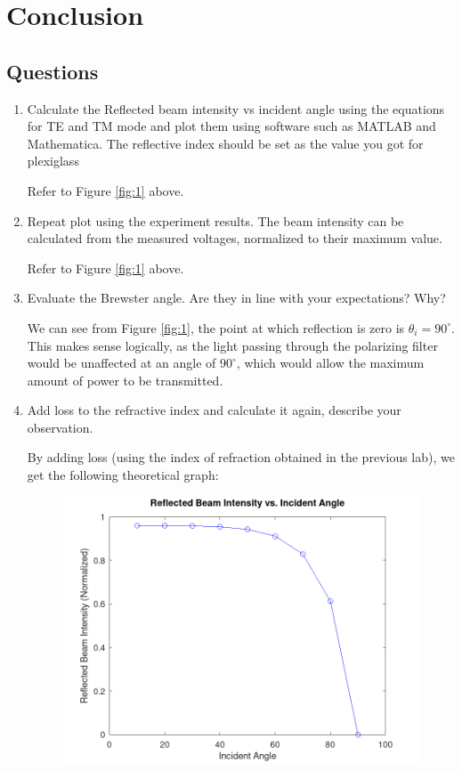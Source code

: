 \documentclass[
	letterpaper, %
	10pt, %
]{CSUniSchoolLabReport}
\begin{document}
\section{Conclusion}

\subsection{Questions}

\begin{enumerate}

  \item  Calculate the Reflected beam intensity vs incident angle using the equations for TE and TM mode and plot them using software such as MATLAB and Mathematica. The reflective index should be set as the value you got for plexiglass

    Refer to Figure \ref{fig:1} above.

  \item Repeat plot using the experiment results. The beam intensity can be calculated from the measured voltages, normalized to their maximum value.

    Refer to Figure \ref{fig:1} above.


  \item Evaluate the Brewster angle. Are they in line with your expectations? Why?

    We can see from Figure \ref{fig:1}, the point at which reflection is zero is $\theta_i=90^{\circ}$. This makes sense logically, as the light passing through the polarizing filter would be unaffected at an angle of $90^{\circ}$, which would allow the maximum amount of power to be transmitted.

  \item Add loss to the refractive index and calculate it again, describe your observation.

    By adding loss (using the index of refraction obtained in the previous lab), we get the following theoretical graph:

\begin{figure}[H]
  \centering
  \includegraphics[width=.9\textwidth]{Figures/Lab Seven/Lab7Plot2.png}
  \label{fig:2}
\end{figure}


\end{enumerate}
\end{document}

